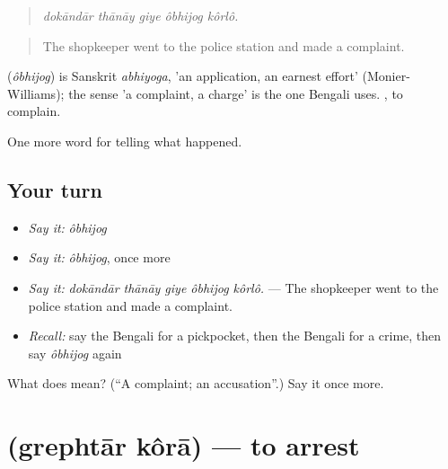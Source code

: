 \begin{quote}
    
\end{quote}

\begin{quote}
\emph{dokāndār thānāy giye ôbhijog kôrlô.}
\end{quote}

\begin{quote}
The shopkeeper went to the police station and made a complaint.
\end{quote}

\begin{cousinweb}
\textbf{} (\emph{ôbhijog}) is Sanskrit \emph{abhiyoga}, 'an application, an earnest effort' (Monier-Williams); the sense 'a complaint, a charge' is the one Bengali uses.  , to complain.
\end{cousinweb}

\begin{grammarlens}[title={What you've built}]
One more word for telling what happened.
\end{grammarlens}

\subsection*{Your turn}
\begin{itemize}
\raggedright
  \item \emph{Say it:} \emph{ôbhijog}
  \item \emph{Say it:} \emph{ôbhijog}, once more
  \item \emph{Say it:} \emph{dokāndār thānāy giye ôbhijog kôrlô.} — The shopkeeper went to the police station and made a complaint.
  \item \emph{Recall:} say the Bengali for a pickpocket, then the Bengali for a crime, then say \emph{ôbhijog} again
\end{itemize}

\begin{tcolorbox}[breakable,colback=teal!4,colframe=teal!35!black,title={Before you move on}]
What does  mean? (\textquotedblleft{}A complaint; an accusation\textquotedblright{}.) Say it once more.
\end{tcolorbox}
\section[\texorpdfstring{\bn{গ্রেফতার} \bn{করা} (grephtār kôrā)}{গ্রেফতার করা (grephtār kôrā)}]{  (grephtār kôrā) — to arrest}

